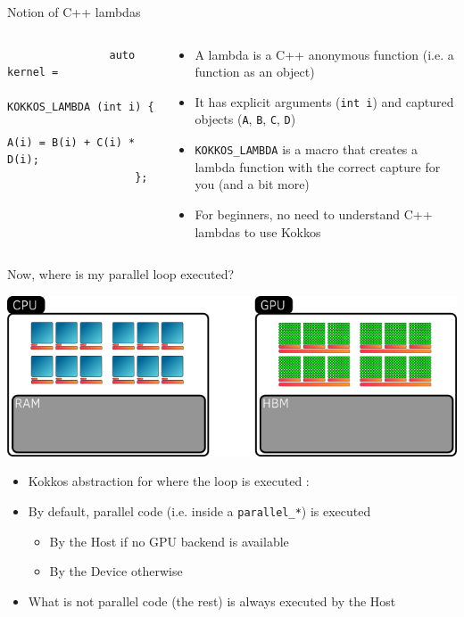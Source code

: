 \documentclass[aspectratio=169]{beamer}
\begin{document}
\begin{frame}[fragile]{Notion of C++ lambdas}
    \begin{columns}
        \begin{column}{0.5\linewidth}
            \begin{verbatim}
                auto kernel =
                    KOKKOS_LAMBDA (int i) {
                        A(i) = B(i) + C(i) * D(i);
                    };
            \end{verbatim}
        \end{column}
        \begin{column}{0.5\linewidth}
            \begin{itemize}
                \item A lambda is a C++ anonymous function (i.e. a function as an object)
                \item It has explicit arguments (\texttt{int i}) and captured objects (\texttt{A}, \texttt{B}, \texttt{C}, \texttt{D})
                \item \texttt{KOKKOS\_LAMBDA} is a macro that creates a lambda function with the correct capture for you (and a bit more)
                \item For beginners, no need to understand C++ lambdas to use Kokkos
            \end{itemize}
        \end{column}
    \end{columns}
\end{frame}


\begin{frame}{Now, where is my parallel loop executed?}
    \begin{center}
        \includegraphics[width=0.8\linewidth]{execution_space.png}
    \end{center}
    \begin{itemize}
        \item Kokkos abstraction for where the loop is executed : 
        \item By default, parallel code (i.e. inside a \texttt{parallel\_*}) is executed
        \begin{itemize}
            \item By the Host if no GPU backend is available
            \item By the Device otherwise
        \end{itemize}
        \item What is not parallel code (the rest) is always executed by the Host
    \end{itemize}
\end{frame}
\end{document}
